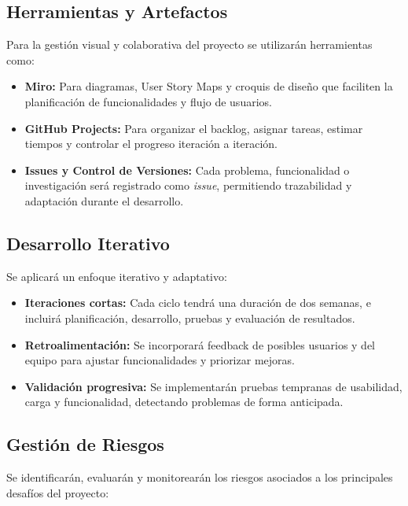 \subsection{Herramientas y Artefactos}
Para la gestión visual y colaborativa del proyecto se utilizarán herramientas como:
\begin{itemize}
    \item \textbf{Miro:} Para diagramas, User Story Maps y croquis de diseño que faciliten la planificación de funcionalidades y flujo de usuarios.
    \item \textbf{GitHub Projects:} Para organizar el backlog, asignar tareas, estimar tiempos y controlar el progreso iteración a iteración.
    \item \textbf{Issues y Control de Versiones:} Cada problema, funcionalidad o investigación será registrado como \textit{issue}, permitiendo trazabilidad y adaptación durante el desarrollo.
\end{itemize}

\subsection{Desarrollo Iterativo}
Se aplicará un enfoque iterativo y adaptativo:
\begin{itemize}
    \item \textbf{Iteraciones cortas:} Cada ciclo tendrá una duración de dos semanas, e incluirá planificación, desarrollo, pruebas y evaluación de resultados.
    \item \textbf{Retroalimentación:} Se incorporará feedback de posibles usuarios y del equipo para ajustar funcionalidades y priorizar mejoras.
    \item \textbf{Validación progresiva:} Se implementarán pruebas tempranas de usabilidad, carga y funcionalidad, detectando problemas de forma anticipada.
\end{itemize}

\subsection{Gestión de Riesgos}
\label{sec:methodology-risk-gestion}
Se identificarán, evaluarán y monitorearán los riesgos asociados a los principales desafíos del proyecto:

